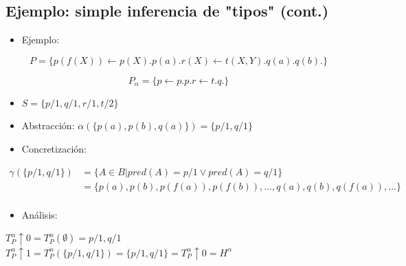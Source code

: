 \documentclass[11pt]{article}
\begin{document}
\subsection*{Ejemplo: simple inferencia de "tipos" (cont.)}
\label{sec:org9a6e6fd}

\begin{itemize}
\item Ejemplo:
\end{itemize}

$$P = \{p(f(X)) \leftarrow p(X). 
    p(a). 
    r(X) ← t(X,Y). 
    q(a). 
    q(b). \}$$

$$P_\alpha = \{p \leftarrow p. 
    p. 
    r ← t. 
    q.\} $$

\begin{itemize}
\item \(S = \{p/1, q/1, r/1, t/2\}\)

\item Abstracción: \(\alpha(\{p(a), p(b), q(a)\}) = \{p/1, q/1\}\)

\item Concretización:
\end{itemize}
\begin{align}
\gamma(\{p/1, q/1\}) &= \{A \in B | pred(A) = p/1 \vee pred(A) = q/1\} \\
&= \{p(a), p(b), p(f(a)), p(f(b)),\ldots, q(a), q(b), q(f(a)),\ldots \} \\
\end{align}

\begin{itemize}
\item Análisis:
\end{itemize}
\(T^\alpha_P \uparrow 0 = T^\alpha_P(\emptyset) = {p / 1, q / 1}\) \\
\(T^\alpha_P \uparrow 1 = T^\alpha_P(\{p/1, q/1\}) = \{p/1, q/1\} = T^\alpha_P \uparrow 0 = H^\alpha\)
\end{document}
